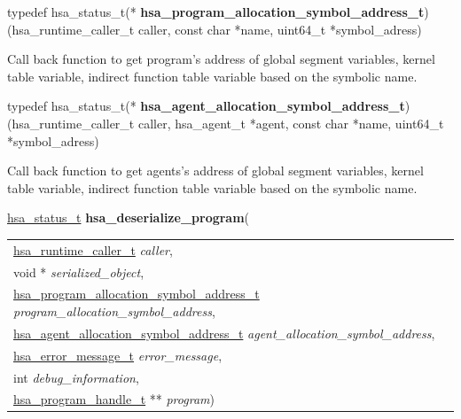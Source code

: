 \documentclass[final]{book}
\newcommand{\hsaarg}[1]{\textit{#1}}
\begin{document}
\begin{appendices}
\noindent\begin{tcolorbox}[nobeforeafter,arc=0mm,colframe=white,colback=lightgray,left=0mm]
typedef hsa_status_t(*  \hypertarget{group--HsailLinkerServiceLayer-1gabb459306071ec274922272ffc08377d5}{\textbf{hsa_program_allocation_symbol_address_t}})(hsa_runtime_caller_t caller, const char *name, uint64_t *symbol_adress)
\end{tcolorbox}
Call back function to get program's address of global segment variables, kernel table variable, indirect function table variable based on the symbolic name.
\\

\noindent\begin{tcolorbox}[nobeforeafter,arc=0mm,colframe=white,colback=lightgray,left=0mm]
typedef hsa_status_t(*  \hypertarget{group--HsailLinkerServiceLayer-1ga80c1b1c0b3038774860c169f13015ede}{\textbf{hsa_agent_allocation_symbol_address_t}})(hsa_runtime_caller_t caller, hsa_agent_t *agent, const char *name, uint64_t *symbol_adress)
\end{tcolorbox}
Call back function to get agents's address of global segment variables, kernel table variable, indirect function table variable based on the symbolic name.
\\

\noindent\begin{tcolorbox}[breakable,nobeforeafter,colframe=white,colback=lightgray,left=0mm]
\hyperlink{group--status-1gad755322e7ff95456520e8abdbe90d225}{hsa_status_t} \hypertarget{group--HsailLinkerServiceLayer-1ga890e93e651841a0470f5bf3dab78f69c}{\textbf{hsa_deserialize_program}}(
\vspace{-3.5mm}\begin{longtable}{@{}p{\textwidth}}
\hspace{1.7em}\hyperlink{group--RuntimeCommon-1ga7d9b1191602415f5dd3893985cc93826}{hsa_runtime_caller_t} \hsaarg{caller},\\
\hspace{1.7em}void * \hsaarg{serialized_object},\\
\hspace{1.7em}\hyperlink{group--HsailLinkerServiceLayer-1gabb459306071ec274922272ffc08377d5}{hsa_program_allocation_symbol_address_t} \hsaarg{program_allocation_symbol_address},\\
\hspace{1.7em}\hyperlink{group--HsailLinkerServiceLayer-1ga80c1b1c0b3038774860c169f13015ede}{hsa_agent_allocation_symbol_address_t} \hsaarg{agent_allocation_symbol_address},\\
\hspace{1.7em}\hyperlink{group--FinalizerCoreApi-1ga0105dcb4254850e0ec03d44fc54e11b8}{hsa_error_message_t} \hsaarg{error_message},\\
\hspace{1.7em}int \hsaarg{debug_information},\\
\hspace{1.7em}\hyperlink{group--HsailLinkerServiceLayer-1ga7b28ca39da981be49aac99608eb386cb}{hsa_program_handle_t} ** \hsaarg{program})\end{longtable}


\end{tcolorbox}
\end{appendices}
\end{document}
